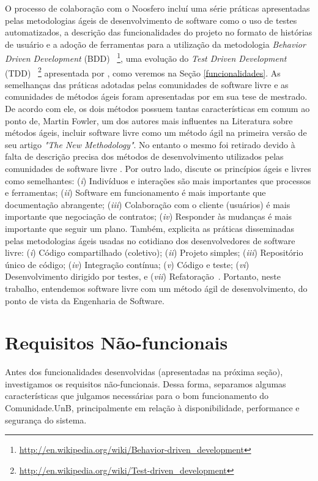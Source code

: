 O processo de colaboração com o Noosfero incluí uma série práticas apresentadas
pelas metodologias ágeis de desenvolvimento de software como o uso de testes
automatizados, a descrição das funcionalidades do projeto no formato de
histórias de usuário e a adoção de ferramentas para a utilização da metodologia
\textit{Behavior Driven Development} (BDD)%
~\footnote{\url{http://en.wikipedia.org/wiki/Behavior-driven_development}},
uma evolução do \textit{Test Driven Development} (TDD)%
~\footnote{\url{http://en.wikipedia.org/wiki/Test-driven_development}}
apresentada por , como veremos na Seção
\ref{funcionalidades}.
%
As semelhanças das práticas adotadas pelas comunidades de software livre e as
comunidades de métodos ágeis foram apresentadas por 
em sua tese de mestrado. De acordo com ele, os dois
métodos possuem tantas características em comum ao ponto de, Martin Fowler,
um dos autores mais influentes na Literatura sobre métodos ágeis,
incluir software livre como um método ágil na primeira versão de seu artigo
\textit{"The New Methodology"}. No entanto o mesmo foi retirado devido
à falta de descrição precisa dos métodos de desenvolvimento utilizados pelas
comunidades de software livre .
%
Por outro lado,  discute os princípios ágeis e livres
como semelhantes:
%
(\textit{i}) Indivíduos e interações são mais importantes que processos e
ferramentas;
(\textit{ii}) Software em funcionamento é mais importante que documentação
abrangente;
(\textit{iii}) Colaboração com o cliente (usuários) é mais importante que
negociação de contratos;
(\textit{iv}) Responder às mudanças é mais importante que seguir um plano.
%
Também, explicita as práticas disseminadas pelas metodologias ágeis usadas no
cotidiano dos desenvolvedores de software livre:
(\textit{i}) Código compartilhado (coletivo);
(\textit{ii}) Projeto simples;
(\textit{iii}) Repositório único de código;
(\textit{iv}) Integração contínua;
(\textit{v}) Código e teste;
(\textit{vi}) Desenvolvimento dirigido por testes, e
(\textit{vii}) Refatoração~\cite{corbucci2011}. Portanto, neste trabalho,
entendemos software livre com um método ágil de desenvolvimento, do ponto de
vista da Engenharia de Software.

\section{Requisitos Não-funcionais}
\label{sec:non-functional-req}

Antes dos funcionalidades desenvolvidas (apresentadas na próxima seção),
investigamos os requisitos não-funcionais. Dessa forma, separamos algumas
características que julgamos necessárias para o bom funcionamento do
Comunidade.UnB, principalmente em relação à disponibilidade, performance e
segurança do sistema.

